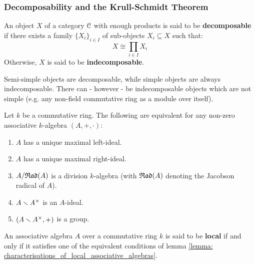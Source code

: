        \subsubsection{Decomposability and the Krull-Schmidt Theorem}
            \begin{definition} \label{def: (in)decomposable_objects}
                An object $X$ of a category $\mathcal{C}$ with enough products is said to be \textbf{decomposable} if there exists a family $\{X_i\}_{i \in I}$ of sub-objects $X_i \subseteq X$ such that:
                    $$X \cong \prod_{i \in I} X_i$$
                Otherwise, $X$ is said to be \textbf{indecomposable}.
            \end{definition}
            \begin{remark}
                Semi-simple objects are decomposable, while simple objects are always indecomposable. There can - however - be indecomposable objects which are not simple (e.g. any non-field commutative ring as a module over itself). 
            \end{remark}
            \begin{lemma} \label{lemma: characterisations_of_local_associative_algebras}
                \cite[Theorem 19.1]{lam_first_course_in_noncommutative_rings} Let $k$ be a commutative ring. The following are equivalent for any non-zero associative $k$-algebra $(A, +, \cdot)$:
                    \noindent
                    \begin{enumerate}
                        \item $A$ has a unique maximal left-ideal.
                        \item $A$ has a unique maximal right-ideal. 
                        \item $A/\mathfrak{Rad}(A)$ is a division $k$-algebra (with $\mathfrak{Rad}(A)$ denoting the Jacobson radical of $A$).
                        \item $A \setminus A^{\x}$ is an $A$-ideal.
                        \item $(A \setminus A^{\x}, +)$ is a group. 
                    \end{enumerate}
            \end{lemma}
            \begin{definition} \label{def: local_associative_algebras}
                An associative algebra $A$ over a commutative ring $k$ is said to be \textbf{local} if and only if it satisfies one of the equivalent conditions of lemma \ref{lemma: characterisations_of_local_associative_algebras}.
            \end{definition}
